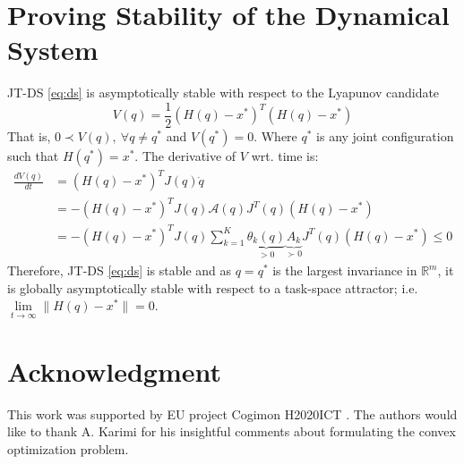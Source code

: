 \documentclass[letterpaper, 10 pt, conference,fleqn]{ieeeconf}
\begin{document}
{\footnotesize
\appendices
\section{Proving Stability of the Dynamical System}
\label{appendix:stability}
JT-DS \eqref{eq:ds} is asymptotically stable with respect to the Lyapunov candidate
\[ V(q) = \frac{1}{2}(H(q) - x^*)^T(H(q) - x^*) \]
That is, $ 0 \prec V(q),~ \forall q \neq q^*$ and $ V(q^*) = 0 $. Where $q^*$ is any joint configuration such that $H(q^*) = x^*$.  The derivative of $ V $ wrt. time is:
\begin{equation}
\begin{aligned}
\frac{dV(q)}{dt} &= (H(q) - x^*)^TJ(q)\dot{q}\\
&= -(H(q) - x^*)^TJ(q)\mathcal{A}(q)J^T(q)(H(q) - x^*)\\
&= -(H(q) - x^*)^TJ(q)\sum_{k=1}^{K}\underbrace{\theta_k(q)}_{> 0}\underbrace{A_k}_{\succ 0}J^T(q)(H(q) - x^*)\leq 0
\end{aligned}
\end{equation}
Therefore, JT-DS \eqref{eq:ds} is stable and as $ q=q^* $ is the largest invariance in $ \mathbb{R}^m $, it is  globally asymptotically stable with respect to a task-space attractor; i.e. $\lim\limits_{t\rightarrow \infty} \| H(q)-x^*\|=0 $.}

\section*{Acknowledgment}
\footnotesize
This work was supported by EU project Cogimon H2020\textendash ICT . The authors would like to thank A. Karimi for his insightful comments about formulating the convex optimization problem.



%



\end{document}

